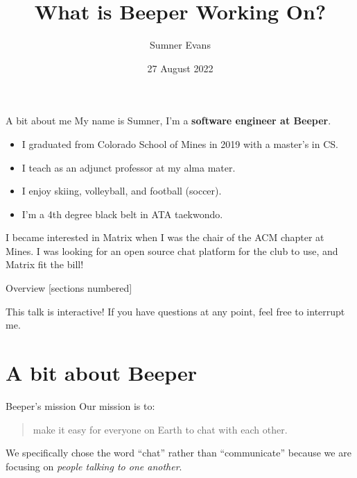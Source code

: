 \documentclass{beeper}
\title{What is Beeper Working On?}
\author{Sumner Evans}
\institute{Beeper}
\date{27 August 2022}
\begin{document}
\begin{frame}{A bit about me}
    My name is Sumner, I'm a \textbf{software engineer at Beeper}.
    \begin{itemize}
        \item I graduated from Colorado School of Mines in 2019 with a master's
            in CS.
        \item I teach as an adjunct professor at my alma mater.
        \item I enjoy skiing, volleyball, and football (soccer).
        \item I'm a 4th degree black belt in ATA taekwondo.
    \end{itemize}
    \pause

    I became interested in Matrix when I was the chair of the ACM chapter at
    Mines. I was looking for an open source chat platform for the club to use,
    and Matrix fit the bill!
\end{frame}

\begin{frame}{Overview}
    [sections numbered]
    \tableofcontents[hideallsubsections]

    \begin{block}{This talk is interactive!}
        If you have questions at any point, feel free to interrupt me.
    \end{block}
\end{frame}

\section{A bit about Beeper}

\begin{frame}{Beeper's mission}
    Our mission is to:\\

    \begin{quote}
        make it easy for everyone on Earth to chat with each other.
    \end{quote}
    \pause

    We specifically chose the word ``chat'' rather than ``communicate'' because
    we are focusing on \textit{people talking to one another}.
\end{frame}
\end{document}
